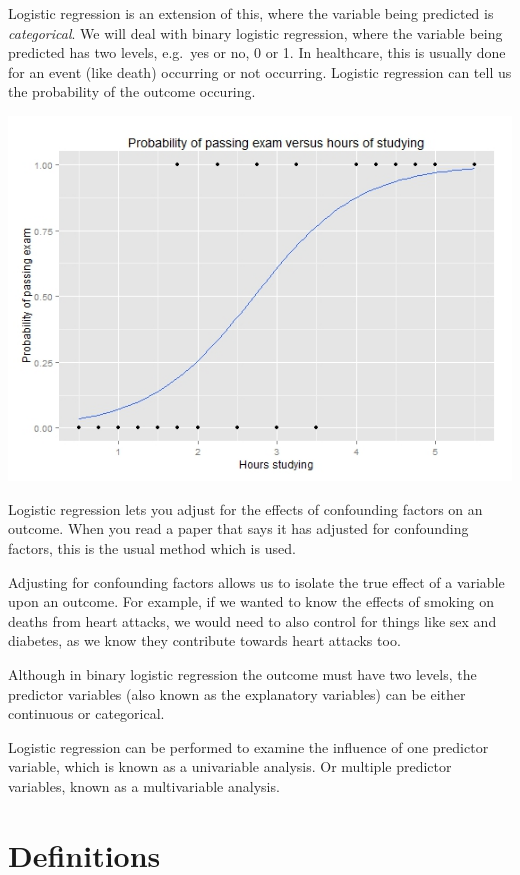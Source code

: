 \documentclass[12pt,]{krantz}
\theoremstyle{definition}
\theoremstyle{definition}
\theoremstyle{definition}
\theoremstyle{remark}
\begin{document}
Logistic regression is an extension of this, where the variable being
predicted is \emph{categorical}. We will deal with binary logistic
regression, where the variable being predicted has two levels, e.g.~yes
or no, 0 or 1. In healthcare, this is usually done for an event (like
death) occurring or not occurring. Logistic regression can tell us the
probability of the outcome occuring.

\includegraphics{images/exam_pass.jpeg}

Logistic regression lets you adjust for the effects of confounding
factors on an outcome. When you read a paper that says it has adjusted
for confounding factors, this is the usual method which is used.

Adjusting for confounding factors allows us to isolate the true effect
of a variable upon an outcome. For example, if we wanted to know the
effects of smoking on deaths from heart attacks, we would need to also
control for things like sex and diabetes, as we know they contribute
towards heart attacks too.

Although in binary logistic regression the outcome must have two levels,
the predictor variables (also known as the explanatory variables) can be
either continuous or categorical.

Logistic regression can be performed to examine the influence of one
predictor variable, which is known as a univariable analysis. Or
multiple predictor variables, known as a multivariable analysis.

\hypertarget{definitions}{%
\section{Definitions}\label{definitions}}
\end{document}
